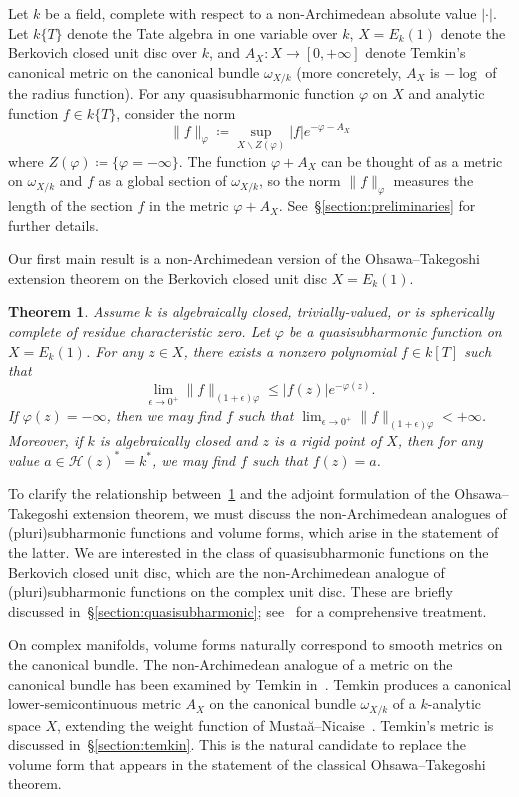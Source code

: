 \documentclass[10pt,reqno]{amsart}
\theoremstyle{plain}
\newtheorem{thmy}{Theorem}
\newenvironment{thmx}{\stepcounter{theorem}\begin{thmy}}{\end{thmy}}
\theoremstyle{definition}
\renewcommand{\H}{\mathcal{H}}
\numberwithin{equation}{section}
\begin{document}
Let $k$ be a field, complete with respect to a non-Archimedean absolute value $| \cdot |$. Let $k\{T \}$ denote the Tate algebra in one variable over $k$, $X = E_k(1)$ denote the Berkovich closed unit disc over $k$, and $A_X \colon X \to [0,+\infty]$ denote Temkin's canonical metric on the canonical bundle $\omega_{X/k}$ (more concretely, $A_X$ is $-\log$ of the radius function). For any quasisubharmonic function $\varphi$ on $X$ and analytic function $f \in k\{ T\}$, consider the norm
$$
\| f \|_{\varphi} \coloneqq \sup_{X \backslash Z(\varphi)} |f|e^{-\varphi - A_X} 
$$
where $Z(\varphi ) \coloneqq \{ \varphi = -\infty \}$. The function $\varphi + A_X$ can be thought of as a metric on $\omega_{X/k}$ and $f$ as a global section of $\omega_{X/k}$, so the norm $\| f \|_{\varphi}$ measures the length of the section $f$ in the metric $\varphi + A_X$. See~\S\ref{section:preliminaries} for further details.

Our first main result is a non-Archimedean version of the Ohsawa--Takegoshi extension theorem on the Berkovich closed unit disc $X = E_k(1)$.

\begin{thmx}\label{thm:main}
Assume $k$ is algebraically closed, trivially-valued, or is spherically complete of residue characteristic zero. 
Let $\varphi$ be a quasisubharmonic function on $X = E_k(1)$.
For any $z \in X$, there exists a nonzero polynomial $f \in k[T]$ such that
$$
\lim_{\epsilon \to 0^+} \| f \|_{(1+\epsilon)\varphi} \leq |f(z)| e^{-\varphi(z)}.
$$
If $\varphi(z) = -\infty$, then we may find $f$ such that $\lim_{\epsilon \to 0^+} \| f\|_{(1+\epsilon)\varphi} < +\infty$. Moreover, if $k$ is algebraically closed and $z$ is a rigid point of $X$, then for any value $a \in \H(z)^*=k^*$, we may find $f$ such that $f(z) = a$.
\end{thmx}

To clarify the relationship between~\cref{thm:main} and the adjoint formulation of the Ohsawa--Takegoshi extension theorem, we must discuss the non-Archimedean analogues of (pluri)subharmonic functions and volume forms, which arise in the statement of the latter. We are interested in the class of quasisubharmonic functions on the Berkovich closed unit disc, which are the non-Archimedean analogue of (pluri)subharmonic functions on the complex unit disc. These are briefly discussed in~\S\ref{section:quasisubharmonic}; see~\cite{baker-rumely, dynberko} for a comprehensive treatment. 

On complex manifolds, volume forms naturally correspond to smooth metrics on the canonical bundle. 
The non-Archimedean analogue of a metric on the canonical bundle has been examined by Temkin in~\cite{temkin}. 
Temkin produces a canonical lower-semicontinuous metric $A_X$ on the canonical bundle $\omega_{X/k}$ of a $k$-analytic space $X$, extending the weight function of Musta\u{a}--Nicaise~\cite{mustata-nicaise}.
Temkin's metric is discussed in~\S\ref{section:temkin}. This is the natural candidate to replace the volume form that appears in the statement of the classical Ohsawa--Takegoshi theorem. 
\end{document}
